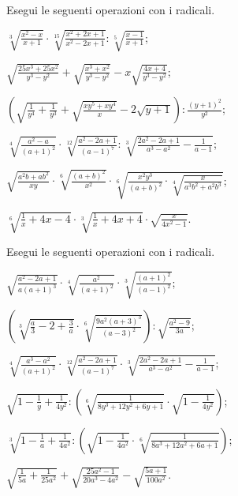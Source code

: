 \begin{esercizio}[\Ast]
 \label{ese:2.79}
Esegui le seguenti operazioni con i radicali.
 \begin{enumeratea}
 \item $\sqrt[3]{\frac{x^2-x}{x+1}}\cdot \sqrt[15]{\frac{x^2+2x+1}{x^2-2x+1}}:\sqrt[5]{\frac{x-1}{x+1}}$;
 \item $\sqrt{\frac{25x^3+25x^2}{y^3-y^2}}+\sqrt{\frac{x^3+x^2}{y^3-y^2}}-x\sqrt{\frac{4x+4}{y^3-y^2}}$;
 \item $\left(\sqrt{\frac 1{y^4}+\frac 1{y^3}}+\sqrt{\frac{xy^5+xy^4} x}-2\sqrt{y+1}\right):\frac{(y+1)^2}{y^2}$;
 \item $\sqrt[4]{\frac{a^2-a}{(a+1)^2}}\cdot \sqrt[12]{\frac{a^2-2a+1}{(a-1)^7}}:\sqrt[3]{\frac{2a^2-2a+1}{a^3-a^2}-\frac 1{a-1}}$;
 \item $\sqrt{\frac{a^2b+ab^2}{xy}}\cdot \sqrt[6]{\frac{(a+b)^2}{x^2}}\cdot \sqrt[6]{\frac{x^2y^3}{(a+b)^2}\cdot \sqrt[4]{\frac x{a^3b^2+a^2b^3}}}$;
 \item $\sqrt[6]{\frac 1 x+4x-4}\cdot \sqrt[3]{\frac 1 x+4x+4}\cdot \sqrt{\frac x{4x^2-1}}$.
 \end{enumeratea}
\end{esercizio}

\begin{esercizio}[\Ast]
 \label{ese:2.80}
Esegui le seguenti operazioni con i radicali.
 \begin{enumeratea}
 \item $\sqrt{\frac{a^2-2a+1}{a(a+1)^3}}\cdot \sqrt[4]{\frac{a^2}{(a+1)^2}}\cdot \sqrt[3]{\frac{(a+1)^2}{(a-1)^2}}$;
 \item $\left(\sqrt[3]{\frac a 3-2+\frac 3 a}\cdot \sqrt[6]{\frac{9a^2(a+3)^3}{(a-3)^2}}\right):\sqrt{\frac{a^2-9}{3a}}$;
 \item $\sqrt[4]{\frac{a^3-a^2}{(a+1)^2}}\cdot \sqrt[12]{\frac{a^2-2a+1}{(a-1)^7}}\cdot \sqrt[3]{\frac{2a^2-2a+1}{a^3-a^2}-\frac 1{a-1}}$;
 \item $\sqrt{1-\frac 1 y+\frac 1{4y^2}}:\left(\sqrt[6]{\frac 1{8y^3+12y^2+6y+1}}\cdot \sqrt{1-\frac 1{4y^2}}\right)$;
 \item $\sqrt[3]{1-\frac 1 a+\frac 1{4a^2}}:\left(\sqrt{1-\frac 1{4a^2}}\cdot \sqrt[6]{\frac 1{8a^3+12a^2+6a+1}}\right)$;
 \item $\sqrt{\frac 1{5a}+\frac 1{25a^2}}+\sqrt{\frac{25a^2-1}{20a^3-4a^2}}-\sqrt{\frac{5a+1}{100a^2}}$.
 \end{enumeratea}
\end{esercizio}

